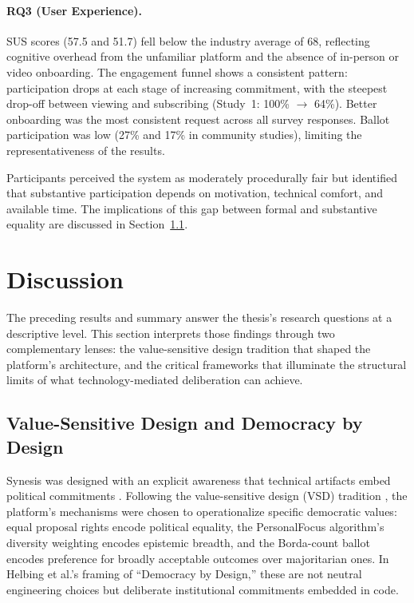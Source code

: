 \documentclass[a4paper, 12pt, twoside]{iviathesis}
\begin{document}
\paragraph{RQ3 (User Experience).}
SUS scores (57.5 and 51.7) fell below the industry average of 68, reflecting cognitive overhead from the unfamiliar platform and the absence of in-person or video onboarding. The engagement funnel shows a consistent pattern: participation drops at each stage of increasing commitment, with the steepest drop-off between viewing and subscribing (Study~1: 100\% $\to$ 64\%). Better onboarding was the most consistent request across all survey responses. Ballot participation was low (27\% and 17\% in community studies), limiting the representativeness of the results.

Participants perceived the system as moderately procedurally fair but identified that substantive participation depends on motivation, technical comfort, and available time. The implications of this gap between formal and substantive equality are discussed in Section~\ref{sec:vsd}.



\section{Discussion}
\label{sec:discussion}

The preceding results and summary answer the thesis's research questions at a descriptive level. This section interprets those findings through two complementary lenses: the value-sensitive design tradition that shaped the platform's architecture, and the critical frameworks that illuminate the structural limits of what technology-mediated deliberation can achieve.

\subsection{Value-Sensitive Design and Democracy by Design}
\label{sec:vsd}

Synesis was designed with an explicit awareness that technical artifacts embed political commitments \cite{winner1980}. Following the value-sensitive design (VSD) tradition \cite{friedman2013value}, the platform's mechanisms were chosen to operationalize specific democratic values: equal proposal rights encode political equality, the PersonalFocus algorithm's diversity weighting encodes epistemic breadth, and the Borda-count ballot encodes preference for broadly acceptable outcomes over majoritarian ones. In Helbing et al.'s \cite{helbing2023democracy} framing of ``Democracy by Design,'' these are not neutral engineering choices but deliberate institutional commitments embedded in code.
\end{document}
